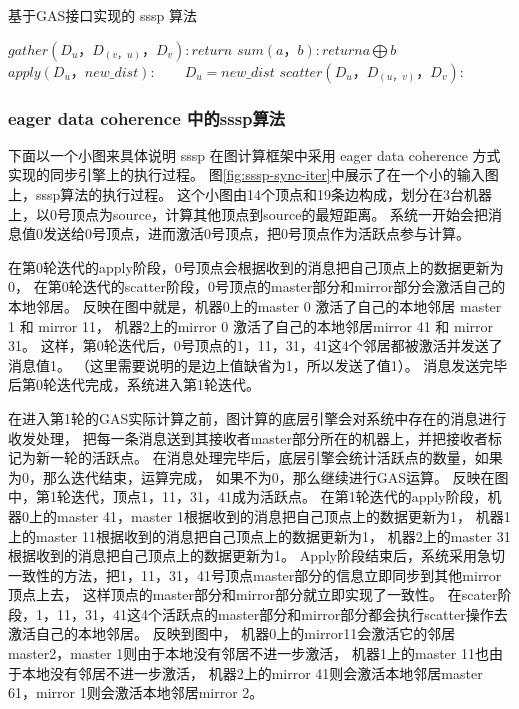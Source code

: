 \begin{algorithm}[!htbp]
  \small
  \caption{基于GAS接口实现的 sssp 算法}\label{alg:sssp}
  \begin{algorithmic}[1]
    \State $gather(D_u，D_{(v，u)}，D_v): return$     
    \State $sum(a，b) : return a\bigoplus b $ 
    \State $apply(D_u， new\_dist): 
      \qquad D_u = new\_dist$
    \State $scatter(D_u， D_{(u，v)}， D_v):$     
    \EndIf
    \EndProcedure
  \end{algorithmic}
\end{algorithm}


\subsubsection{eager data coherence 中的sssp算法}
下面以一个小图来具体说明 sssp 在图计算框架中采用 eager data coherence 方式实现的同步引擎上的执行过程。
图\ref{fig:sssp-sync-iter}中展示了在一个小的输入图上，sssp算法的执行过程。
这个小图由14个顶点和19条边构成，划分在3台机器上，以0号顶点为source，计算其他顶点到source的最短距离。
系统一开始会把消息值0发送给0号顶点，进而激活0号顶点，把0号顶点作为活跃点参与计算。

在第0轮迭代的apply阶段，0号顶点会根据收到的消息把自己顶点上的数据更新为0，
在第0轮迭代的scatter阶段，0号顶点的master部分和mirror部分会激活自己的本地邻居。
反映在图中就是，机器0上的master 0 激活了自己的本地邻居 master 1 和 mirror 11，
机器2上的mirror 0 激活了自己的本地邻居mirror 41 和 mirror 31。
这样，第0轮迭代后，0号顶点的1，11，31，41这4个邻居都被激活并发送了消息值1。
（这里需要说明的是边上值缺省为1，所以发送了值1）。
消息发送完毕后第0轮迭代完成，系统进入第1轮迭代。

在进入第1轮的GAS实际计算之前，图计算的底层引擎会对系统中存在的消息进行收发处理，
把每一条消息送到其接收者master部分所在的机器上，并把接收者标记为新一轮的活跃点。
在消息处理完毕后，底层引擎会统计活跃点的数量，如果为0，那么迭代结束，运算完成，
如果不为0，那么继续进行GAS运算。
反映在图中，第1轮迭代，顶点1，11，31，41成为活跃点。
在第1轮迭代的apply阶段，机器0上的master 41，master 1根据收到的消息把自己顶点上的数据更新为1，
机器1上的master 11根据收到的消息把自己顶点上的数据更新为1，
机器2上的master 31根据收到的消息把自己顶点上的数据更新为1。
Apply阶段结束后，系统采用急切一致性的方法，把1，11，31，41号顶点master部分的信息立即同步到其他mirror顶点上去，
这样顶点的master部分和mirror部分就立即实现了一致性。
在scater阶段，1，11，31，41这4个活跃点的master部分和mirror部分都会执行scatter操作去激活自己的本地邻居。
反映到图中，
机器0上的mirror11会激活它的邻居master2，master 1则由于本地没有邻居不进一步激活，
机器1上的master 11也由于本地没有邻居不进一步激活，
机器2上的mirror 41则会激活本地邻居master 61，mirror 1则会激活本地邻居mirror 2。

